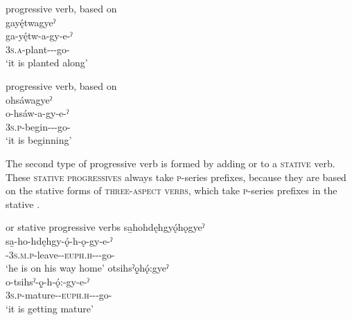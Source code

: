 \newpage
\ea\label{ex:motionpronchoice41}  progressive verb, based on \\
gayę́twagyeˀ\\
\gll ga-yę́tw-a-gy-e-ˀ\\
 \textsc{3s.a}-plant-{\joinerA}-{\progressive}-go-{\stative}\\
\glt `it is planted along'
\z



\ea\label{ex:motionpronchoice42}  progressive verb, based on \\
ohsáwagyeˀ\\
\gll o-hsáw-a-gy-e-ˀ\\
 \textsc{3s.p}-begin-{\joinerA}-{\progressive}-go-{\stative}\\
\glt `it is beginning'
\z


The second type of progressive verb is formed by adding  or  to a \textsc{stative} verb. These \textsc{stative progressives} always take \textsc{p}-series prefixes, because they are based on the stative forms of \textsc{three-aspect verbs}, which take \textsc{p}-series prefixes in the stative .

\ea\label{ex:motionpronchoice5}  or  stative progressive verbs
\ea sa̱hohdęhgyǫ́hǫgyeˀ\\
\gll sa̱-ho-hdęhgy-ǫ́-h-ǫ-gy-e-ˀ\\
 {\repetitive}-\textsc{3s.m.p}-leave-{\stative}-\textsc{euph.h}-{\joiner}-{\progressive}-go-{\stative}\\
\glt `he is on his way home'
\ex otsihsˀǫ̱hǫ́:gyeˀ\\
\gll o-tsihsˀ-ǫ̱-h-ǫ́:-gy-e-ˀ\\
 \textsc{3s.p}-mature-{\stative}-\textsc{euph.h}-{\joiner}-{\progressive}-go-{\stative}\\
\glt `it is getting mature'
\z
\z

